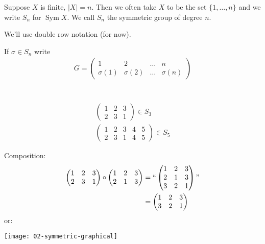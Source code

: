 \begin{notation}
Suppose $X$ is finite, $|X| = n$.
Then we often take $X$ to be the set $\{ 1, \ldots, n \}$ and we write $S_n$ for $\operatorname{Sym} X$.
We call $S_n$ the symmetric group of degree $n$.
\end{notation}

\begin{notation}
We'll use double row notation (for now).

If $\sigma \in S_n$ write
\begin{align*}
  G = \begin{pmatrix}
  1 & 2 & \ldots & n \\
  \sigma(1) & \sigma(2) & \ldots & \sigma(n)
  \end{pmatrix} \\
\end{align*}
\end{notation} 

\begin{example} ~\vspace*{-1.5\baselineskip}
  \begin{align*}
    \begin{pmatrix}
    1 & 2 & 3 \\
    2 & 3 & 1
    \end{pmatrix} \in S_3 \\
    \begin{pmatrix}
    1 & 2 & 3 & 4 & 5 \\
    2 & 3 & 1 & 4 & 5
    \end{pmatrix} \in S_5
\end{align*}
\end{example} 

\begin{example}
  Composition:
\begin{align*}
    \begin{pmatrix}
    1 & 2 & 3 \\
    2 & 3 & 1
    \end{pmatrix} \circ
    \begin{pmatrix}
    1 & 2 & 3 \\
    2 & 1 & 3
    \end{pmatrix}
    &= ``\begin{pmatrix}
    1 & 2 & 3 \\
    2 & 1 & 3 \\
    3 & 2 & 1
    \end{pmatrix}" \\
    &= \begin{pmatrix}
        1 & 2 & 3 \\
        3 & 2 & 1
    \end{pmatrix}
\end{align*}
or:

{\centering \texttt{[image: 02-symmetric-graphical]}}
\end{example} 


